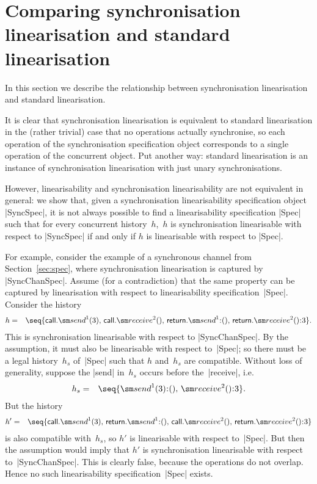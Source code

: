 \section{Comparing synchronisation linearisation and standard linearisation}
\label{sec:relating}

In this section we describe the relationship between synchronisation
linearisation and standard linearisation.

It is clear that synchronisation linearisation is equivalent to standard
linearisation in the (rather trivial) case that no operations actually
synchronise, so each operation of the synchronisation specification object
corresponds to a single operation of the concurrent object.  Put another way:
standard linearisation is an instance of synchronisation linearisation with
just unary synchronisations.

However, linearisability and synchronisation linearisability are not
equivalent in general: we show that, given a synchronisation linearisability
specification object |SyncSpec|, it is not always possible to find a
linearisability specification |Spec| such that for every concurrent
history~$h$,\, $h$ is synchronisation linearisable with respect to |SyncSpec|
if and only if $h$ is linearisable with respect to |Spec|.

For example, consider the example of a synchronous channel from
Section~\ref{sec:spec}, where synchronisation linearisation is captured by
|SyncChanSpec|.  Assume (for a contradiction) that the same property can be
captured by linearisation with respect to linearisability
specification~|Spec|.  Consider the history
\begin{eqnarray*}
h & = & \seq{ 
  \call.\send^1(3),\, \call.\receive^2(),\, 
  \return.\send^1\::(),\, \return.\receive^2()\::3 }.
\end{eqnarray*}
%
This is synchronisation linearisable with respect to |SyncChanSpec|.  By the
assumption, it must also be linearisable with respect to~|Spec|; so there must
be a legal history~$h_s$ of~|Spec| such that $h$ and~$h_s$ are compatible.
Without loss of generality, suppose the |send| in~$h_s$ occurs before
the~|receive|, i.e.
\begin{eqnarray*}
h_s & = & \seq{ \send^1(3)\::(),\, \receive^2()\::3 }.
\end{eqnarray*}
%
But the history
%
\begin{eqnarray*}
h' & = & \seq{ 
  \call.\send^1(3),\, \return.\send^1\::(),\, 
  \call.\receive^2(),\, \return.\receive^2()\::3 }
\end{eqnarray*}
%
is also compatible with~$h_s$, so $h'$ is linearisable with respect to~|Spec|.
But then the assumption would imply that $h'$ is synchronisation linearisable
with respect to~|SyncChanSpec|.  This is clearly false, because the operations
do not overlap.  Hence no such linearisability specification~|Spec| exists.



